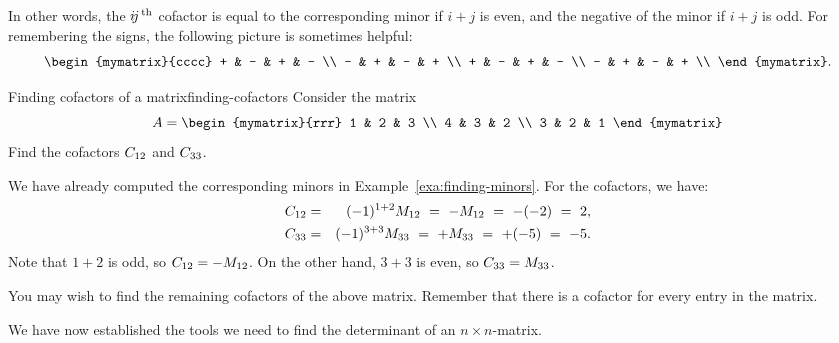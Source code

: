 In other words, the $\ijth$ cofactor is equal to the corresponding
minor if $i+j$ is even, and the negative of the minor if $i+j$ is
odd. For remembering the signs, the following picture is sometimes
helpful:
\begin{equation*}
  \begin{mymatrix}{cccc}
    + & - & + & - \\
    - & + & - & + \\
    + & - & + & - \\
    - & + & - & + \\
  \end{mymatrix}.
\end{equation*}

\begin{example}{Finding cofactors of a matrix}{finding-cofactors}
  Consider the matrix
  \begin{equation*}
    A=\begin{mymatrix}{rrr}
      1 & 2 & 3 \\
      4 & 3 & 2 \\
      3 & 2 & 1
    \end{mymatrix}
  \end{equation*}
  Find the cofactors $\cofactor{A}{12}$ and $\cofactor{A}{33}$.
\end{example}

\begin{solution}
  We have already computed the corresponding minors in
  Example~\ref{exa:finding-minors}. For the cofactors, we have:
  \begin{eqnarray*}
    \cofactor{A}{12} &=& (-1)^{1+2}\minor{A}{12} ~=~ -\minor{A}{12} ~=~ -(-2) ~=~ 2,\\
    \cofactor{A}{33} &=& (-1)^{3+3}\minor{A}{33} ~=~ +\minor{A}{33} ~=~ +(-5) ~=~ -5.
  \end{eqnarray*}
  Note that $1+2$ is odd, so $\cofactor{A}{12}=-\minor{A}{12}$. On the
  other hand, $3+3$ is even, so $\cofactor{A}{33}=\minor{A}{33}$.
\end{solution}

You may wish to find the remaining cofactors of the above
matrix. Remember that there is a cofactor for every entry in the
matrix.

We have now established the tools we need to find the determinant of
an $n\times n$-matrix.


